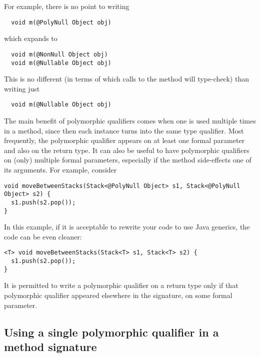 For example, there is no point to writing

\begin{Verbatim}
  void m(@PolyNull Object obj)
\end{Verbatim}

\noindent
which expands to

\begin{Verbatim}
  void m(@NonNull Object obj)
  void m(@Nullable Object obj)
\end{Verbatim}

This is no different (in terms of which calls to the method will
type-check) than writing just

\begin{Verbatim}
  void m(@Nullable Object obj)
\end{Verbatim}

The main benefit of polymorphic qualifiers comes when one is used multiple times
in a method, since then each instance turns into the same type qualifier.
Most frequently, the polymorphic qualifier appears on at least one formal
parameter and also on the return type.  It can also be useful to have
polymorphic qualifiers on (only) multiple formal parameters, especially if
the method side-effects one of its arguments.
For example, consider

\begin{Verbatim}
void moveBetweenStacks(Stack<@PolyNull Object> s1, Stack<@PolyNull Object> s2) {
  s1.push(s2.pop());
}
\end{Verbatim}

\noindent
In this example, if it is acceptable to rewrite your code to use Java
generics, the code can be even cleaner:

\begin{Verbatim}
<T> void moveBetweenStacks(Stack<T> s1, Stack<T> s2) {
  s1.push(s2.pop());
}
\end{Verbatim}

\label{qualifier-polymorphism-return-type}
It is permitted to write a polymorphic qualifier on a return type only if
that polymorphic qualifier appeared elsewhere in the signature, on some
formal parameter.



\subsection{Using a single polymorphic qualifier in a method signature\label{qualifier-polymorphism-single-qualifier}}

